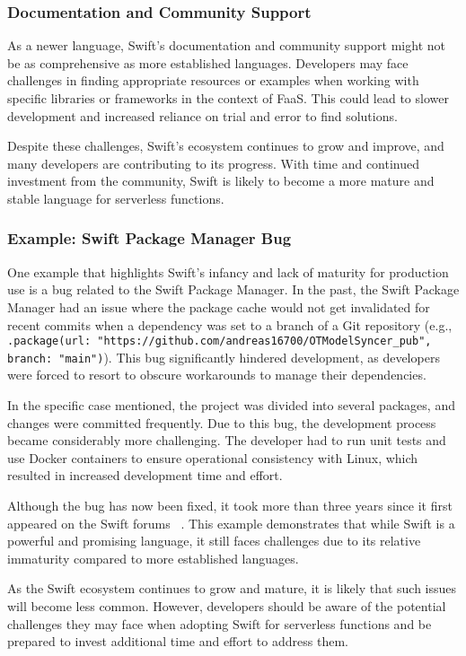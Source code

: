 \subsubsection{Documentation and Community Support}

As a newer language, Swift's documentation and community support might not be as comprehensive as more established languages. Developers may face challenges in finding appropriate resources or examples when working with specific libraries or frameworks in the context of FaaS. This could lead to slower development and increased reliance on trial and error to find solutions.

Despite these challenges, Swift's ecosystem continues to grow and improve, and many developers are contributing to its progress. With time and continued investment from the community, Swift is likely to become a more mature and stable language for serverless functions.

\subsubsection{Example: Swift Package Manager Bug}

One example that highlights Swift's infancy and lack of maturity for production use is a bug related to the Swift Package Manager. In the past, the Swift Package Manager had an issue where the package cache would not get invalidated for recent commits when a dependency was set to a branch of a Git repository 
(e.g., \texttt{.package(url: "https://github.com/andreas16700/OTModelSyncer_pub", branch: "main")}).
This bug significantly hindered development, as developers were forced to resort to obscure workarounds to manage their dependencies.

In the specific case mentioned, the project was divided into several packages, and changes were committed frequently. Due to this bug, the development process became considerably more challenging. The developer had to run unit tests and use Docker containers to ensure operational consistency with Linux, which resulted in increased development time and effort.

Although the bug has now been fixed, it took more than three years since it first appeared on the Swift forums~\cite{swift-forum-bug}
. This example demonstrates that while Swift is a powerful and promising language, it still faces challenges due to its relative immaturity compared to more established languages.

As the Swift ecosystem continues to grow and mature, it is likely that such issues will become less common. However, developers should be aware of the potential challenges they may face when adopting Swift for serverless functions and be prepared to invest additional time and effort to address them.

